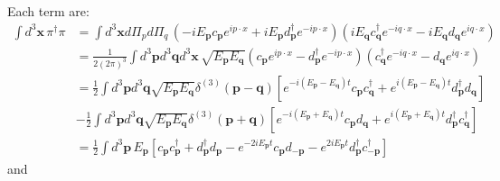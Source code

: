 \documentclass[a4paper,11pt]{article}
\begin{document}
Each term are:
\begin{align}
    \int d^3\mathbf{x}\,\pi^\dagger\pi &= \int d^3\mathbf{x} d\Pi_p d\Pi_q\, \left(-iE_{\mathbf{p}}c_{\mathbf{p}}e^{ip\cdot x} + iE_{\mathbf{p}}d_{\mathbf{p}}^\dagger e^{-ip\cdot x}\right)\left(iE_{\mathbf{q}}c_{\mathbf{q}}^\dagger e^{-iq\cdot x} - iE_{\mathbf{q}}d_{\mathbf{q}} e^{iq\cdot x}\right) \\
    &=\frac{1}{2(2\pi)^3}\int d^3\mathbf{p}d^3\mathbf{q}d^3\mathbf{x}\, \sqrt{E_{\mathbf{p}}E_{\mathbf{q}}} \left(c_{\mathbf{p}}e^{ip\cdot x} -d_{\mathbf{p}}^\dagger e^{-ip\cdot x}\right)\left(c_{\mathbf{q}}^\dagger e^{-iq\cdot x} - d_{\mathbf{q}} e^{iq\cdot x}\right) \\
    &=\frac{1}{2}\int d^3\mathbf{p}d^3\mathbf{q} \sqrt{E_{\mathbf{p}}E_{\mathbf{q}}} \delta^{(3)}(\mathbf{p}-\mathbf{q})\left[e^{-i(E_{\mathbf{p}}-E_{\mathbf{q}})t}c_{\mathbf{p}}c_{\mathbf{q}}^\dagger + e^{i(E_{\mathbf{p}}-E_{\mathbf{q}})t}d_{\mathbf{p}}^\dagger d_{\mathbf{q}}\right] \\
    &-\frac{1}{2}\int d^3\mathbf{p}d^3\mathbf{q} \sqrt{E_{\mathbf{p}}E_{\mathbf{q}}} \delta^{(3)}(\mathbf{p}+\mathbf{q})\left[e^{-i(E_{\mathbf{p}}+E_{\mathbf{q}})t}c_{\mathbf{p}}d_{\mathbf{q}} + e^{i(E_{\mathbf{p}}+E_{\mathbf{q}})t}d_{\mathbf{p}}^\dagger c_{\mathbf{q}}^\dagger\right] \\
    &=\frac{1}{2}\int d^3\mathbf{p}\, E_{\mathbf{p}}\left[c_{\mathbf{p}}c_{\mathbf{p}}^\dagger + d_{\mathbf{p}}^\dagger d_{\mathbf{p}} - e^{-2iE_{\mathbf{p}}t}c_{\mathbf{p}}d_{-\mathbf{p}}-e^{2iE_{\mathbf{p}}t}d_{\mathbf{p}}^\dagger c_{-\mathbf{p}}^\dagger\right]
\end{align}
and
\end{document}

